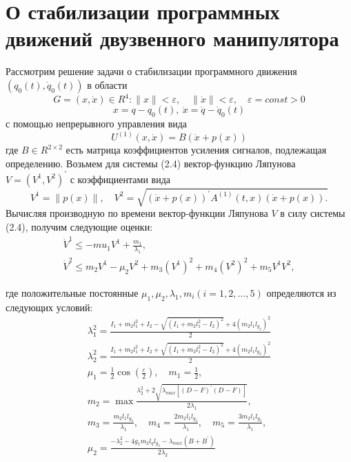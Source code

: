 \section{О стабилизации программных движений двузвенного манипулятора} \label{p23}
Рассмотрим решение задачи о стабилизации программного движения $(q_0 (t), \dot q_0 (t))$ в области 
$$G = {(x, \dot x) \in R^4 : \|x\|<\varepsilon, \quad \|\dot x\|<\varepsilon, \quad \varepsilon=const>0}$$
$$x = q - q_0 (t), \ \dot x = \dot q - \dot q_0 (t)$$
с помощью непрерывного управления вида
\begin{equation}
U^{(1)}(x, \dot x) = B(\dot x + p(x))
\end{equation}    
где $B \in R^{2 \times 2}$ есть матрица коэффициентов усиления сигналов, подлежащая определению.
Возьмем для системы (2.4) вектор-функцию Ляпунова $V = (V^1, V^2)^{'}$  с коэффициентами вида $$V^1 = \|p(x)\|, \quad V^2 = \sqrt{(\dot x + p(x))^{'} A^{(1)}(t, x)(\dot x + p(x)).}$$
Вычисляя производную по времени вектор-функции Ляпунова $V$ в силу системы (2.4), получим следующие оценки:
\begin{equation}
\begin{array}{l}
\dot V^1 \le -mu_1 V^1 + \frac{m_1}{\lambda_1},\\
\dot V^2 \le m_2 V^1 - \mu_2 V^2 + m_3 (V^1)^2 + m_4 (V^2)^2 + m_5 V^1 V^2, 
\end{array}
\end{equation}

где положительные постоянные $\mu_1, \mu_2, \lambda_1, m_i (i=1,2,...,5)$ определяются из следующих условий:
$$
\begin{array}{l}
\displaystyle \lambda_1^2 = \frac{I_1 + m_2 l_1^2 + I_2 - \sqrt{(I_1 + m_2 l_1^2 - I_2)^2} + 4(m_2 l_1 l_{g_2})^2}{2}\\
\displaystyle \lambda_2^2 = \frac{I_1 + m_2 l_1^2 + I_2 + \sqrt{(I_1 + m_2 l_1^2 - I_2)^2} + 4(m_2 l_1 l_{g_2})^2}{2}\\
\displaystyle \mu_1 =\frac12 \cos(\frac{\varepsilon}{2}), \quad m_1 = \frac12,\\
\displaystyle m_2 = \max \frac{\lambda_2^2 + 2 \sqrt{\lambda_{max} [(D-F)^{'} (D-F)]}}{2 \lambda_1},\\
\displaystyle m_3 = \frac{m_2 l_1 l_{g_2}}{\lambda_1}, \quad m_4 = \frac{2 m_2 l_1 l_{g_2}}{\lambda_1}, \quad m_5 = \frac{3 m_2 l_1 l_{g_2}}{\lambda_1},\\
\displaystyle \mu_2 = \frac{-\lambda_2^2 - 4 g_1 m_2 l_q l_{g_2} - \lambda_{max} (B + B^{'})}{2 \lambda_2}
\end{array}
$$


